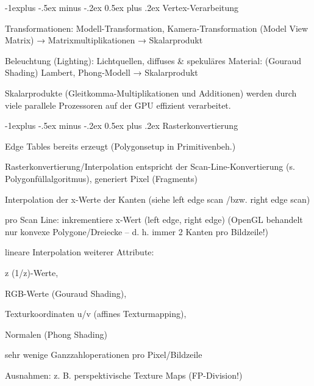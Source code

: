 \documentclass[landscape]{article}
\makeatletter
\renewcommand{\subsection}{\@startsection{subsection}{2}{0mm}%
                                {-1explus -.5ex minus -.2ex}%
                                {0.5ex plus .2ex}%
                                {\normalfont\normalsize\bfseries}}
\makeatother
\begin{document}
\begin{multicols}{3}
  
  \subsection{Vertex-Verarbeitung}
  \begin{itemize*}
    \item Transformationen: Modell-Transformation, Kamera-Transformation (Model View Matrix) → Matrixmultiplikationen → Skalarprodukt
    \item Beleuchtung (Lighting): Lichtquellen, diffuses \& spekuläres Material: (Gouraud Shading) Lambert, Phong-Modell → Skalarprodukt
    \item Skalarprodukte (Gleitkomma-Multiplikationen und Additionen) werden durch viele parallele Prozessoren auf der GPU effizient verarbeitet.
  \end{itemize*}
  
  
  \subsection{Rasterkonvertierung}
  \begin{itemize*}
    \item Edge Tables bereits erzeugt (Polygonsetup in Primitivenbeh.)
    \item Rasterkonvertierung/Interpolation entspricht der Scan-Line-Konvertierung (s. Polygonfüllalgoritmus), generiert Pixel (Fragments)
    \item Interpolation der x-Werte der Kanten (siehe left edge scan /bzw. right edge scan)
    \item pro Scan Line: inkrementiere x-Wert (left edge, right edge) (OpenGL behandelt nur konvexe Polygone/Dreiecke – d. h. immer 2 Kanten pro Bildzeile!)
    \item lineare Interpolation weiterer Attribute:
    \begin{itemize*}
      \item z (1/z)-Werte,
      \item RGB-Werte (Gouraud Shading),
      \item Texturkoordinaten u/v (affines Texturmapping),
      \item Normalen (Phong Shading)
    \end{itemize*}
    \item sehr wenige Ganzzahloperationen pro Pixel/Bildzeile
    \item Ausnahmen: z. B. perspektivische Texture Maps (FP-Division!)
  \end{itemize*}
  

\end{multicols}
\end{document}
